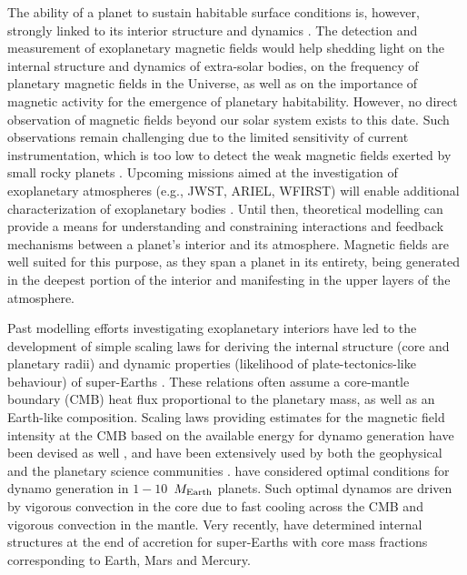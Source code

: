 \documentclass[draft]{agujournal2019} %
\begin{document}
The ability of a planet to sustain habitable surface conditions is, however, strongly linked to its interior structure and dynamics \cite{noack2014can}. The detection and measurement of exoplanetary magnetic fields would help shedding light on the internal structure and dynamics of extra-solar bodies, on the frequency of planetary magnetic fields in the Universe, as well as on the importance of magnetic activity for the emergence of planetary habitability. However, no direct observation of magnetic fields beyond our solar system exists to this date. Such observations remain challenging due to the limited sensitivity of current instrumentation, which is too low to detect the weak magnetic fields exerted by small rocky planets \cite{driscoll_optimal_2011}.
Upcoming missions aimed at the investigation of exoplanetary atmospheres (e.g., JWST, ARIEL, WFIRST) will enable additional characterization of exoplanetary bodies \cite{gardner2006james,spergel2015wide}. Until then, theoretical modelling can provide a means for understanding and constraining interactions and feedback mechanisms between a planet's interior and its atmosphere. Magnetic fields are well suited for this purpose, as they span a planet in its entirety, being generated in the deepest portion of the interior and manifesting in the upper layers of the atmosphere. 

Past modelling efforts investigating exoplanetary interiors have led to the development of simple scaling laws for deriving the internal structure (core and planetary radii) and dynamic properties (likelihood of plate-tectonics-like behaviour) of super-Earths \cite{valencia_internal_2006,seager_massradius_2007}. These relations often assume a core-mantle boundary (CMB) heat flux proportional to the planetary mass, as well as an Earth-like composition. Scaling laws providing estimates for the magnetic field intensity at the CMB based on the available energy for dynamo generation have been devised as well \cite{olson2006dipole,aubert2009modelling}, and have been extensively used by both the geophysical and the planetary science communities \cite{driscoll_optimal_2011,lopez2011magnetic,mcintyre2019planetary}. 
 have considered optimal conditions for dynamo generation in $1-10$~$M_{\rm Earth}$ planets. Such optimal dynamos are driven by vigorous convection in the core due to fast cooling across the CMB and vigorous convection in the mantle. Very recently,  have determined internal structures at the end of accretion for super-Earths with core mass fractions corresponding to Earth, Mars and Mercury. 
\end{document}

